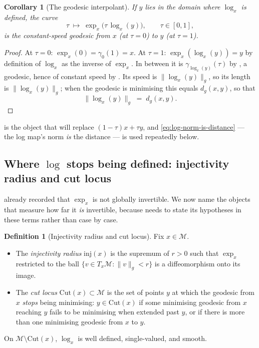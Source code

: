 \documentclass[11pt,a4paper]{report}
\newtheorem{corollary}[corollary]{Corollary}
\theoremstyle{definition}
\newtheorem{definition}[definition]{Definition}
\theoremstyle{remark}
\begin{document}
\begin{corollary}[The geodesic interpolant]
\label{cor:geodesic-interp-general}
If $y$ lies in the domain where $\log_x$ is defined, the curve
\[
\tau\;\longmapsto\;\exp_x\bigl(\tau\,\log_x(y)\bigr),
\qquad \tau\in[0,1],
\]
is the constant-speed geodesic from $x$ (at $\tau=0$) to $y$ (at $\tau=1$).
\end{corollary}

\begin{proof}
At $\tau=0$: $\exp_x(0)=\gamma_0(1)=x$. At $\tau=1$:
$\exp_x(\log_x(y))=y$ by definition of $\log_x$ as the inverse of $\exp_x$.
In between it is $\gamma_{\log_x(y)}(\tau)$ by ,
a geodesic, hence of constant speed by
. Its speed is
$\|\log_x(y)\|_g$, so its length is $\|\log_x(y)\|_g$; when the geodesic is
minimising this equals $d_g(x,y)$, so that
\begin{equation}
\label{eq:log-norm-is-distance}
\bigl\|\log_x(y)\bigr\|_g \;=\; d_g(x,y) .
\end{equation}
\end{proof}

 is the object that will replace
$(1-\tau)x+\tau y$, and \eqref{eq:log-norm-is-distance} --- the log map's
norm \emph{is} the distance --- is used repeatedly below.

\subsection{Where $\log$ stops being defined: injectivity radius and cut locus}
\label{sec:cut-locus}

 already recorded that $\exp_x$ is not globally
invertible. We now name the objects that measure how far it \emph{is}
invertible, because  needs to state its hypotheses
in these terms rather than case by case.

\begin{definition}[Injectivity radius and cut locus]
\label{def:cut-locus}
Fix $x\in\mathcal M$.
\begin{itemize}
\item The \emph{injectivity radius} $\mathrm{inj}(x)$ is the supremum of
$r>0$ such that $\exp_x$ restricted to the ball
$\{v\in T_x\mathcal M:\|v\|_g<r\}$ is a diffeomorphism onto its image.
\item The \emph{cut locus} $\mathrm{Cut}(x)\subset\mathcal M$ is the set of
points $y$ at which the geodesic from $x$ \emph{stops} being minimising:
$y\in\mathrm{Cut}(x)$ if some minimising geodesic from $x$ reaching $y$
fails to be minimising when extended past $y$, or if there is more than one
minimising geodesic from $x$ to $y$.
\end{itemize}
On $\mathcal M\setminus\mathrm{Cut}(x)$, $\log_x$ is well defined,
single-valued, and smooth.
\end{definition}
\end{document}
